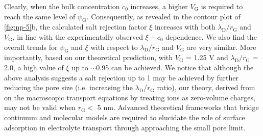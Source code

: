 %
Clearly, when the bulk concentration $c_{0}$ increases, a higher
$V_{\mathrm{G}}$ is required to reach the same level of
$\psi_{\mathrm{G}}$. Consequently, as revealed in the contour plot of
\autoref{fig:np-5}b, the calculated salt rejection factor $\xi$
increases with both $\lambda_{\mathrm{D}} / r_{\mathrm{G}}$ and
$V_{\mathrm{G}}$, in line with the experimentally observed
$\xi - c_{0}$ dependence. We also find the overall trends for
$\psi_{\mathrm{G}}$ and $\xi$ with respect to
$\lambda_{\mathrm{D}}/r_{\mathrm{G}}$ and $V_{\mathrm{G}}$ are very
similar. More importantly, based on our theoretical prediction, with
$V_{\mathrm{G}}$ = 1.25 V and $\lambda_{\mathrm{D}} / r_{\mathrm{G}}$
= {2.0}, a high value of $\xi$ up to $\sim$0.95 can be achieved.  We
notice that although the above analysis suggests a salt rejection up
to 1 may be achieved by further reducing the pore size (i.e. increasing
the $\lambda_{\mathrm{D}}/r_{\mathrm{G}}$ ratio), our theory, derived
from on the macroscopic transport equations by treating ions as
zero-volume charges, may not be valid when $r_{\mathrm{G}}<$ 5
nm\autocite{Jain_2015_subcontin_ion}.  Advanced theoretical frameworks
that bridge continuum and molecular models are required to elucidate
the role of surface adsorption in electrolyte transport through
approaching the small pore limit.



